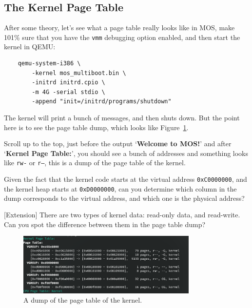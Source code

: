 \subsection{The Kernel Page Table}

After some theory, let's see what a page table really looks like in MOS, make
101\% sure that you have the \texttt{vmm} debugging option enabled, and then start
the kernel in QEMU:

\begin{verbatim}
    qemu-system-i386 \
        -kernel mos_multiboot.bin \
        -initrd initrd.cpio \
        -m 4G -serial stdio \
        -append "init=/initrd/programs/shutdown"
\end{verbatim}

The kernel will print a bunch of messages, and then shuts down. But the point here
is to see the page table dump, which looks like Figure~\ref{fig:mm_dump_pagetable}.

\begin{exercise}
    \item Scroll up to the top, just before the output `\textbf{Welcome to MOS!}' and after
    `\textbf{Kernel Page Table:}', you should see a bunch of addresses and
    something looks like \texttt{rw-} or \texttt{r--}, this is a dump of the
    page table of the kernel.

    \item Given the fact that the kernel code starts at the virtual address
    \texttt{0xC0000000}, and the kernel heap starts at \texttt{0xD0000000},
    can you determine which column in the dump corresponds to the virtual
    address, and which one is the physical address?

    \item{} [Extension] There are two types of kernel data: read-only data,
    and read-write. Can you spot the difference between them in the page table dump?
\end{exercise}

\begin{figure}[htbp]
    \centering
    \includegraphics[width=0.8\textwidth]{assets/c4.page-table-dump.png}
    \caption{A dump of the page table of the kernel.}
    \label{fig:mm_dump_pagetable}
\end{figure}

